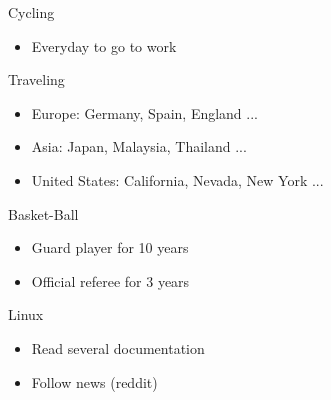 \documentclass[letterpaper]{jm-cv} %
\begin{document}
\begin{multicols}{2}
  \small {

    {\color{mainblue}\faBicycle} Cycling
    {\footnotesize
      \vspace{-0.2cm}
      \begin{itemize}
      \item[\color{maingray}\faArrowRight] Everyday to go to work
      \end{itemize}
    }

    {\color{mainblue}\faUser} Traveling
    {\footnotesize
      \vspace{-0.2cm}
      \begin{itemize}
      \item[\color{maingray}\faArrowRight] Europe: Germany, Spain, England ...
      \item[\color{maingray}\faArrowRight] Asia: Japan, Malaysia, Thailand ...
      \item[\color{maingray}\faArrowRight] United States: California, Nevada, New York ...
      \end{itemize}
    }

    {\color{mainblue}\faDribbble} Basket-Ball
    {\footnotesize
      \vspace{-0.2cm}
      \begin{itemize}
      \item[\color{maingray}\faArrowRight] Guard player for 10 years
      \item[\color{maingray}\faArrowRight] Official referee for 3 years
      \end{itemize}
    }

    {\color{mainblue}\faLinux} Linux
    {\footnotesize
      \vspace{-0.2cm}
      \begin{itemize}
      \item[\color{maingray}\faArrowRight] Read several documentation
      \item[\color{maingray}\faArrowRight] Follow news (reddit)
      \end{itemize}
    }
  }

\end{multicols}
\end{document}
